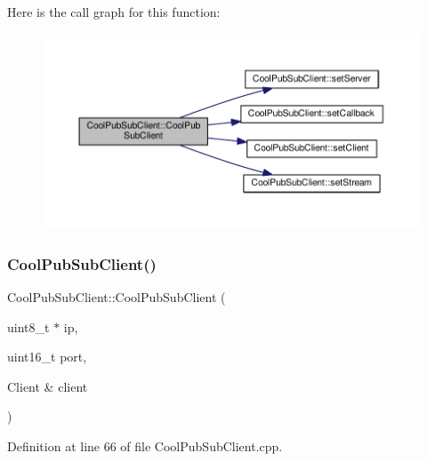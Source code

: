 Here is the call graph for this function\+:
\nopagebreak
\begin{figure}[H]
\begin{center}
\leavevmode
\includegraphics[width=350pt]{class_cool_pub_sub_client_a0797679d710bf2b1aa802107bdb1a2fe_cgraph}
\end{center}
\end{figure}
\mbox{\label{class_cool_pub_sub_client_a15e4dd41ebda943c377539086f70469d}} 
\subsubsection{\texorpdfstring{Cool\+Pub\+Sub\+Client()}{CoolPubSubClient()}\hspace{0.1cm}{\footnotesize\ttfamily [7/14]}}
{\footnotesize\ttfamily Cool\+Pub\+Sub\+Client\+::\+Cool\+Pub\+Sub\+Client (\begin{DoxyParamCaption}\item[{uint8\+\_\+t $\ast$}]{ip,  }\item[{uint16\+\_\+t}]{port,  }\item[{Client \&}]{client }\end{DoxyParamCaption})}



Definition at line 66 of file Cool\+Pub\+Sub\+Client.\+cpp.

